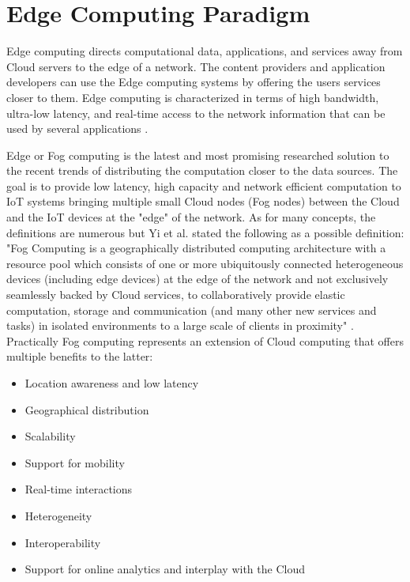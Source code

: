 
\section{Edge Computing Paradigm}
Edge computing directs computational data, applications, and services away from Cloud servers to the edge of a network. The content providers and application developers can use the Edge computing systems by offering the users services closer to them. Edge computing is characterized in terms of high bandwidth, ultra-low latency, and real-time access to the network information that can be used by several applications \cite{khan2019edge}.

Edge or Fog computing is the latest and most promising researched solution to the recent trends of distributing the computation closer to the data sources. The goal is to provide low latency, high capacity and network efficient computation to IoT systems bringing multiple small Cloud nodes (Fog nodes) between the Cloud and the IoT devices at the "edge" of the network. As for many concepts, the definitions are numerous \cite{sahni2018data} but Yi et al. stated the following as a possible definition: "Fog Computing is a geographically distributed computing architecture with a resource pool which consists of one or more ubiquitously connected heterogeneous devices (including edge devices) at the edge of the network and not exclusively seamlessly backed by Cloud services, to collaboratively provide elastic computation, storage and communication (and many other new services and tasks) in isolated environments to a large scale of clients in proximity" \cite{yi2015fog}.
Practically Fog computing represents an extension of Cloud computing that offers multiple benefits to the latter:

\begin{itemize}
    \item Location awareness and low latency
    \item Geographical distribution
    \item Scalability
    \item Support for mobility
    \item Real-time interactions
    \item Heterogeneity
    \item Interoperability
    \item Support for online analytics and interplay with the Cloud
\end{itemize}


